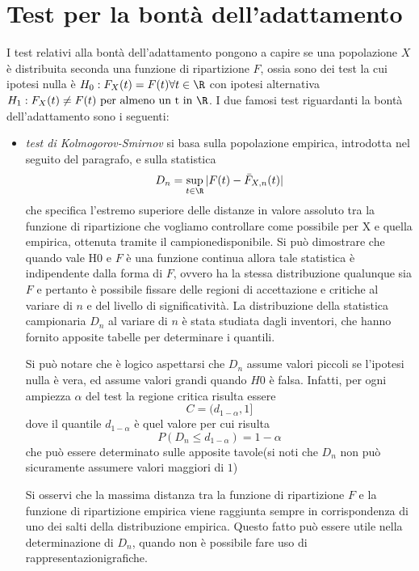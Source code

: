 \section{Test per la bontà dell'adattamento}
I test relativi alla bontà dell'adattamento pongono a capire se una popolazione $X$ è distribuita seconda una funzione
di ripartizione $F$, ossia sono dei test la cui ipotesi nulla è $H_0:F_X(t) = F(t) \forall t \in \R$ con ipotesi
alternativa $H_1:F_X(t) \neq F(t) \mbox{ per almeno un t in \R}$.\newline
I due famosi test riguardanti la bontà dell'adattamento sono i seguenti:
\begin{itemize}
    \item \emph{test di Kolmogorov-Smirnov} si basa sulla popolazione empirica, introdotta nel seguito del paragrafo, e
        sulla statistica
        \[ D_n = \sup _{t \in \R} |F(t) - \bar{F}_{X, n}(t)| \]
        che specifica l’estremo superiore delle distanze in valore assoluto tra la funzione di ripartizione che vogliamo
        controllare come possibile per X e quella empirica, ottenuta tramite il campionedisponibile.\newline
        Si può dimostrare che quando vale H0 e $F$ è una funzione continua allora tale statistica è indipendente 
        dalla forma di $F$, ovvero ha la stessa distribuzione qualunque sia $F$ e pertanto è possibile fissare delle 
        regioni di accettazione e critiche al variare di $n$ e del livello di significatività.\newline
        La distribuzione della statistica campionaria $D_n$ al variare di $n$ è stata studiata dagli inventori,
        che hanno fornito apposite tabelle per determinare i quantili.

        Si può notare che è logico aspettarsi che  $D_n$ assume valori piccoli se l’ipotesi nulla è vera, ed assume 
        valori grandi quando $H0$ è falsa.\newline
        Infatti, per ogni ampiezza $\alpha$ del test la regione critica risulta essere
        \[ C = (d_{1 - \alpha}, 1] \]
        dove il quantile $d_{1 - \alpha}$ è quel valore per cui risulta 
        \[ P(D_n \leq d_{1 - \alpha}) = 1 - \alpha \]
        che può essere determinato sulle apposite tavole(si noti che $D_n$ non può sicuramente assumere valori maggiori di $1$)

        Si osservi che la massima distanza tra la funzione di ripartizione $F$ e la funzione di ripartizione empirica 
        viene raggiunta sempre in corrispondenza di uno dei salti della distribuzione empirica.\newline
        Questo fatto può essere utile nella determinazione di $D_n$, quando non è possibile fare uso di rappresentazionigrafiche.
        

\end{itemize}

